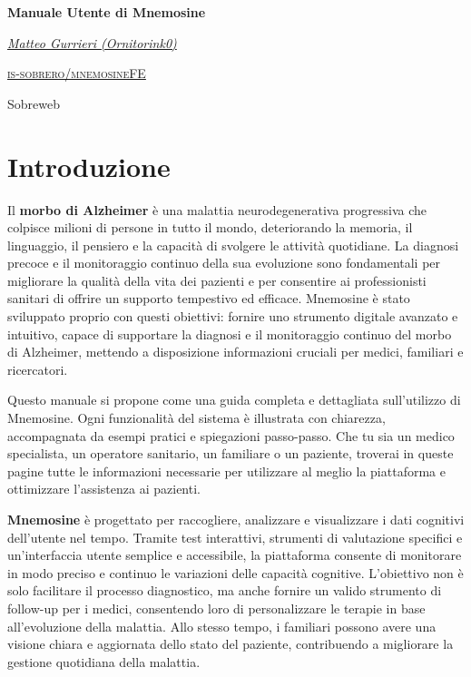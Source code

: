 \documentclass[a4paper,12pt]{book}
\begin{document}
	
	\begin{titlepage}
		\centering
		\vspace*{3cm}
		
		{\Huge \textbf{Manuale Utente di Mnemosine}\par}
		
		\vspace{2cm}
		
		{\Large\itshape {\href{https://github.com/Ornitorink0}{Matteo Gurrieri (Ornitorink0)}}\par}
		
		\vfill
		
		\textsc{\href{https://github.com/is-sobrero/mnemosineFE}{is-sobrero/mnemosineFE}}
		
		\vspace{1cm}
		
		{\large Sobreweb\par}
	\end{titlepage}
	
	\tableofcontents %
	
	\chapter*{Introduzione}
	Il \textbf{morbo di Alzheimer} è una malattia neurodegenerativa progressiva che colpisce milioni di persone in tutto il mondo, deteriorando la memoria, il linguaggio, il pensiero e la capacità di svolgere le attività quotidiane. La diagnosi precoce e il monitoraggio continuo della sua evoluzione sono fondamentali per migliorare la qualità della vita dei pazienti e per consentire ai professionisti sanitari di offrire un supporto tempestivo ed efficace. Mnemosine è stato sviluppato proprio con questi obiettivi: fornire uno strumento digitale avanzato e intuitivo, capace di supportare la diagnosi e il monitoraggio continuo del morbo di Alzheimer, mettendo a disposizione informazioni cruciali per medici, familiari e ricercatori.
	
	Questo manuale si propone come una guida completa e dettagliata sull’utilizzo di Mnemosine. Ogni funzionalità del sistema è illustrata con chiarezza, accompagnata da esempi pratici e spiegazioni passo-passo. Che tu sia un medico specialista, un operatore sanitario, un familiare o un paziente, troverai in queste pagine tutte le informazioni necessarie per utilizzare al meglio la piattaforma e ottimizzare l’assistenza ai pazienti.
	
	\textbf{Mnemosine} è progettato per raccogliere, analizzare e visualizzare i dati cognitivi dell'utente nel tempo. Tramite test interattivi, strumenti di valutazione specifici e un’interfaccia utente semplice e accessibile, la piattaforma consente di monitorare in modo preciso e continuo le variazioni delle capacità cognitive. L’obiettivo non è solo facilitare il processo diagnostico, ma anche fornire un valido strumento di follow-up per i medici, consentendo loro di personalizzare le terapie in base all’evoluzione della malattia. Allo stesso tempo, i familiari possono avere una visione chiara e aggiornata dello stato del paziente, contribuendo a migliorare la gestione quotidiana della malattia.
	
\end{document}
